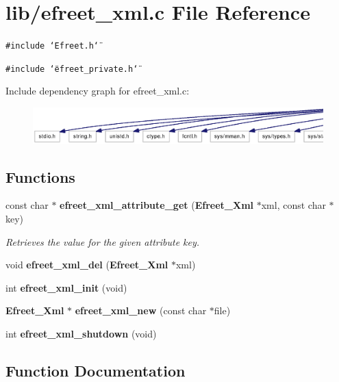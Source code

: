 \section{lib/efreet\_\-xml.c File Reference}
\label{efreet__xml_8c}


{\tt \#include \char`\"{}Efreet.h\char`\"{}}\par
{\tt \#include \char`\"{}efreet\_\-private.h\char`\"{}}\par


Include dependency graph for efreet\_\-xml.c:\nopagebreak
\begin{figure}[H]
\begin{center}
\leavevmode
\includegraphics[width=420pt]{efreet__xml_8c__incl}
\end{center}
\end{figure}
\subsection*{Functions}
\begin{CompactItemize}
\item 
const char $\ast$ {\bf efreet\_\-xml\_\-attribute\_\-get} ({\bf Efreet\_\-Xml} $\ast$xml, const char $\ast$key)
\begin{CompactList}\small\item\em Retrieves the value for the given attribute key. \item\end{CompactList}\item 
void {\bf efreet\_\-xml\_\-del} ({\bf Efreet\_\-Xml} $\ast$xml)
\item 
int {\bf efreet\_\-xml\_\-init} (void)
\item 
{\bf Efreet\_\-Xml} $\ast$ {\bf efreet\_\-xml\_\-new} (const char $\ast$file)
\item 
int {\bf efreet\_\-xml\_\-shutdown} (void)
\end{CompactItemize}


\subsection{Function Documentation}
